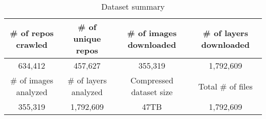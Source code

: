 
\begin{table*}
	\centering
	\caption{Dataset summary} \label{tab-dataset-summary}
	\begin{tabular}{c|c|c|c}%
		\# of repos crawled & \# of unique repos & \# of images downloaded  & \# of layers downloaded \\
		\hline
		634,412                 & 457,627                 & 355,319                    & 1,792,609  \\
		\hline
		\hline
		\# of images analyzed & \# of layers analyzed & Compressed dataset size              &  Total \# of files \\
		\hline
		355,319                     & 1,792,609                     & 47TB                        & 1,792,609  \\
		\hline
	\end{tabular}
\end{table*}

